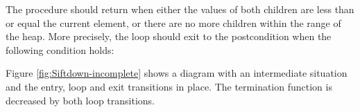 \documentclass[english,submission]{eptcs}
\newcommand{\procedurelabel}[1]{\small \texttt{#1}}
\newcommand{\situationrule}{\vspace{-1.2ex}\mbox{}\rule[1.2ex]{\linewidth}{0.4pt}\mbox{}}
\newcommand{\procedurerule}{\situationrule}
\newcommand{\invariant}[1]{\small \ensuremath{\mathtt{#1}}}
\newcommand{\declaration}[1]{\small \ensuremath{\mathtt{#1}}}
\newcommand{\ibpid}[1]{\texttt{#1}}
\newcommand{\ibpkw}[1]{\textsf{\textbf{#1}}}
\begin{document}
The procedure should return when either the values of both children
are less than or equal the current element, or there are no more children
within the range of the heap. More precisely, the loop should exit
to the postcondition when the following condition holds:
\begin{quote}

\end{quote}
\noindent Figure \ref{fig:Siftdown-incomplete} shows a diagram with
an intermediate situation  and the entry, loop and
exit transitions in place. The termination function 
is decreased by both loop transitions.
\begin{figure}
\noindent \begin{centering}
\end{centering}
\end{figure}
\end{document}
